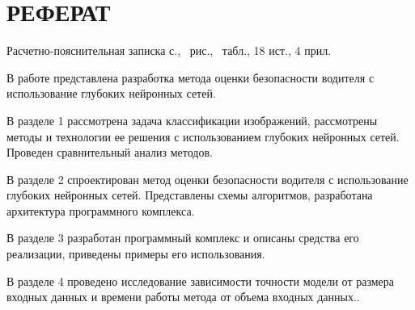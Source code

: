 \section*{РЕФЕРАТ}

Расчетно-пояснительная записка \pageref{LastPage} с., \totalfigures\ рис., \totaltables\ табл., 18 ист., 4 прил.

В работе представлена разработка метода оценки безопасности водителя с использование глубоких нейронных сетей.

В разделе 1 рассмотрена задача классификации изображений, рассмотрены методы и технологии ее решения с использованием глубоких нейронных сетей. Проведен сравнительный анализ методов.

В разделе 2 спроектирован метод оценки безопасности водителя с использование глубоких нейронных сетей. Представлены схемы алгоритмов, разработана архитектура программного комплекса.

В разделе 3 разработан программный комплекс и описаны средства его реализации, приведены примеры его использования.

В разделе 4 проведено исследование зависимости точности модели от размера входных данных и времени работы метода от объема входных данных..


\pagebreak